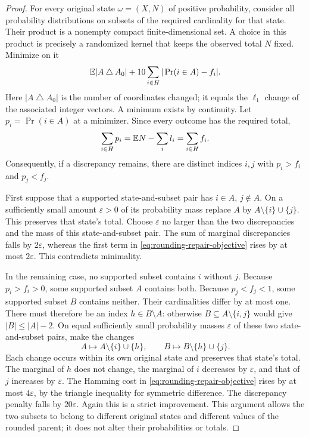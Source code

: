 \begin{proof}
For every original state $\omega=(X,N)$ of positive probability, consider all
probability distributions on subsets of the required cardinality for that
state.  Their product is a nonempty compact finite-dimensional set.  A choice
in this product is precisely a randomized kernel that keeps the observed
total $N$ fixed.  Minimize on it
\begin{equation}\label{eq:rounding-repair-objective}
 \mathbb E|A\mathbin{\triangle}A_0|
       +10\sum_{i\in H}|\Pr(i\in A)-f_i|.
\end{equation}
Here $|A\mathbin{\triangle}A_0|$ is the number of coordinates changed; it
equals the $\ell_1$ change of the associated integer vectors.  A minimum
exists by continuity.  Let $p_i=\Pr(i\in A)$ at a minimizer.  Since every
outcome has the required total,
\[
                 \sum_{i\in H}p_i=\mathbb E N-\sum_i l_i
                                      =\sum_{i\in H}f_i.
\]
Consequently, if a discrepancy remains, there are distinct indices $i,j$
with $p_i>f_i$ and $p_j<f_j$.

First suppose that a supported state-and-subset pair has $i\in A$, $j\notin A$.
On a sufficiently small amount $\varepsilon>0$ of its probability mass replace
$A$ by $A\setminus\{i\}\cup\{j\}$.  This preserves that state's total.  Choose
$\varepsilon$ no larger than the two discrepancies and the mass of this
state-and-subset pair.  The sum of marginal discrepancies falls by
$2\varepsilon$, whereas the first term in
\eqref{eq:rounding-repair-objective} rises by at most $2\varepsilon$.
This contradicts minimality.

In the remaining case, no supported subset contains $i$ without $j$.
Because $p_i>f_i>0$, some supported subset $A$ contains both.  Because
$p_j<f_j<1$, some supported subset $B$ contains neither.  Their cardinalities
differ by at most one.  There must therefore be an index $h\in B\setminus A$:
otherwise $B\subseteq A\setminus\{i,j\}$ would give
$|B|\le|A|-2$.  On equal sufficiently small probability masses
$\varepsilon$ of these two state-and-subset pairs, make the changes
\[
 A\longmapsto A\setminus\{i\}\cup\{h\},
 \qquad
 B\longmapsto B\setminus\{h\}\cup\{j\}.
\]
Each change occurs within its own original state and preserves that state's
total.  The marginal of $h$ does not change, the marginal of $i$ decreases by
$\varepsilon$, and that of $j$ increases by $\varepsilon$.  The Hamming cost
in \eqref{eq:rounding-repair-objective} rises by at most $4\varepsilon$, by
the triangle inequality for symmetric difference.  The discrepancy penalty
falls by $20\varepsilon$.  Again this is a strict improvement.  This argument
allows the two subsets to belong to different original states and different
values of the rounded parent; it does not alter their probabilities or totals.


\end{proof}
